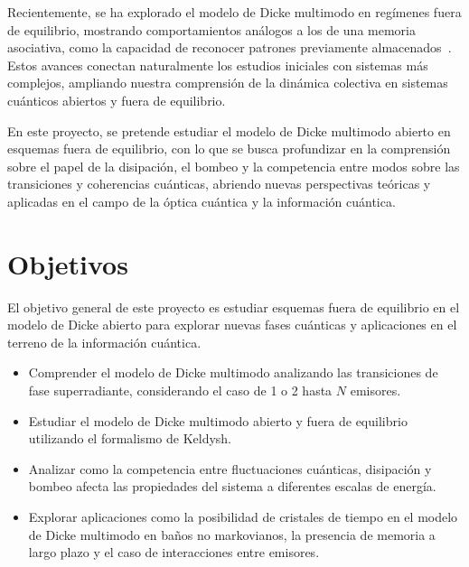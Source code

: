 \documentclass[onecolumn,notitlepage,letterpaper,aps,pra,12pt]{article}
\numberwithin{equation}{section}
\begin{document}
Recientemente, se ha explorado el modelo de Dicke multimodo en regímenes fuera de equilibrio, mostrando comportamientos análogos a los de una memoria asociativa, como la capacidad de reconocer patrones previamente almacenados~\cite{fiorelli2020}. Estos avances conectan naturalmente los estudios iniciales con sistemas más complejos, ampliando nuestra comprensión de la dinámica colectiva en sistemas cuánticos abiertos y fuera de equilibrio.


En este proyecto, se pretende estudiar el modelo de Dicke multimodo abierto en esquemas fuera de equilibrio, con lo que se busca profundizar en la comprensión sobre el papel de la disipación, el bombeo y la competencia entre modos sobre las transiciones y coherencias cuánticas, abriendo nuevas perspectivas teóricas y aplicadas en el campo de la óptica cuántica y la información cuántica. 


\section{Objetivos}

El objetivo general de este proyecto es estudiar esquemas fuera de equilibrio en el modelo de Dicke abierto para explorar nuevas fases cuánticas y aplicaciones en el terreno de la información cuántica. 

\begin{itemize}
    \item Comprender el modelo de Dicke multimodo analizando las transiciones de fase superradiante, considerando el caso de 1 o 2 hasta $N$ emisores.
    \item Estudiar el modelo de Dicke multimodo abierto y fuera de equilibrio utilizando el formalismo de Keldysh. 
    \item Analizar como la competencia entre fluctuaciones cuánticas, disipación y bombeo afecta las propiedades del sistema a diferentes escalas de energía. 
    \item Explorar aplicaciones como la posibilidad de cristales de tiempo en el modelo de Dicke multimodo en baños no markovianos, la presencia de memoria a largo plazo y el caso de interacciones entre emisores. 
\end{itemize}
\end{document}
